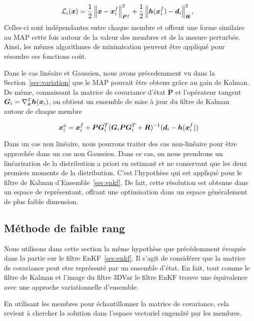 \begin{equation*}
    \mathcal L_i(\bm x) = \frac12 \left\lVert \bm x -\bm x^f_i \right\rVert^2_{\bm P^f} + \frac12 \left\lVert \bm h(\bm x^f_i) - \bm d_i \right\rVert_{\bm R}^2,
\end{equation*}Celles-ci sont indépendantes entre chaque membre et offrent une forme similaire au MAP cette fois autour de la valeur des membres et de la mesure perturbée. Ainsi, les mêmes algorithmes de minimisation peuvent être appliqué pour résoudre ces fonctions coût.

Dans le cas linéaire et Gaussien, nous avons précedemment vu dans la Section~\ref{sec:variation} que le MAP pouvait être obtenu grâce au gain de Kalman. De même, connaissant la matrice de covariance d'état $\bm P$ et l'opérateur tangent $\bm G_i = \nabla^T_{\bm{x}} \bm h(\bm{x}_i)$, on obtient un ensemble de mise à jour du filtre de Kalman autour de chaque membre

\begin{equation}~\label{eq:rml-kalman}
    \bm x ^a_i = \bm x^f_i + \bm P \bm G_i^T (\bm G_i \bm{P} \bm G_i^T + \bm{R})^{-1} (\bm{d}_i - \bm h(\bm{x}_i^f))
\end{equation}

Dans un cas non linéaire, nous pourrons traiter des cas non-linéaire pour être approchée dans un cas non Gaussien. Dans ce cas, on nous prendrons un linéarisation de la distribution a priori en estimant et ne conservant que les deux premiers moments de la distribution. C'est l'hypothèse qui est appliqué pour le filtre de Kalman d'Ensemble~\ref{sec:enkf}. De fait, cette résolution est obtenue dans un espace de représentant, offrant une optimisation dans un espace généralement de plus faible dimension.

\subsection{Méthode de faible rang}

Nous utilisons dans cette section la même hypothèse que précédemment évoquée dans la partie sur le filtre EnKF~\ref{sec:enkf}. Il s'agit de considérer que la matrice de covariance peut etre représenté par un ensemble d'état. En fait, tout comme le filtre de Kalman et l'image du filtre 3DVar le filtre EnKF trouve une équivalence avec une approche variationnelle d'ensemble.

En utilisant les membres pour échantillonner la matrice de covariance, cela revient à chercher la solution dans l'espace vectoriel engendré par les membres.

